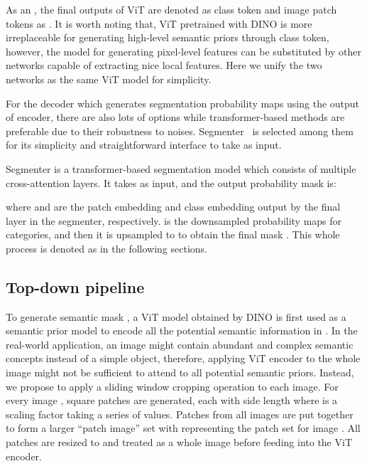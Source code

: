 \documentclass[runningheads]{llncs}
\begin{document}
\iffalse
The input to the first layer is denoted as  and obtained as 

where  is the concatenation operator,  is a patch operator that splits an image into patches of size ,  denotes the class token, and  is the positional embedding. 

The -th layer of the attention block takes  from the previous layer as input, and generates  as follows:

where  is the layer normalization operator,  is the multi-layer perceptron operator, and .  contains  number of patch feature and one class feature. Each attention block produces an attention map  that can be formulated as:

where  are the query, key and value, respectively, which are mapped and reshaped from , and  is the dimension of embedding feature in attention block.
\fi

As an , the final outputs of ViT are denoted as class token  and image patch tokens as . It is worth noting that, ViT pretrained with DINO is more irreplaceable for generating high-level semantic priors through class token, however, the model for generating pixel-level features can be substituted by other networks capable of extracting nice local features. Here we unify the two networks as the same ViT model for simplicity. 

For the decoder which generates segmentation probability maps using the output of encoder, there are also lots of options while transformer-based methods are preferable due to their robustness to noises. Segmenter~\cite{strudel2021segmenter} is selected among them for its simplicity and straightforward interface to take  as input.

Segmenter is a transformer-based segmentation model which consists of multiple cross-attention layers. It takes    as input, and the output probability mask is: 

where  and  are the patch embedding and class embedding output by the final layer in the segmenter, respectively.  is the downsampled probability maps for  categories, and then it is upsampled to  to obtain the final mask . This whole process is denoted as  in the following sections.

\subsection{Top-down pipeline}

To generate semantic mask , a ViT model obtained by DINO is first used as a semantic prior model to encode all the potential semantic information in . In the real-world application, an image might contain abundant and complex semantic concepts instead of a simple object, therefore, applying ViT encoder to the whole image might not be sufficient to attend to all potential semantic priors. Instead, we propose to apply a sliding window cropping operation to each image. For every image ,   square patches are generated, each with side length  where  is a scaling factor taking a series of values. 
Patches from all images are put together to form a larger ``patch image'' set  with  representing the patch set for image .
All patches are resized to   and treated as a whole image before feeding into the ViT encoder.
\end{document}
